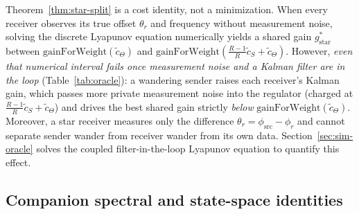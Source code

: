 \documentclass[11pt,a4paper]{article}
\theoremstyle{definition}
\begin{document}
Theorem~\ref{thm:star-split} is a cost identity, not a minimization. When
every receiver observes its true offset $\theta_r$ and frequency without
measurement noise, solving the discrete Lyapunov equation numerically yields a
shared gain $g_{\mathrm{star}}^*$ between
$\mathrm{gainForWeight}(\tilde c_\Theta)$ and
$\mathrm{gainForWeight}(\frac{R-1}{R}\tilde c_S + \tilde c_\Theta)$.
However, \emph{even that numerical interval fails once measurement noise and a
Kalman filter are in the loop} (Table~\ref{tab:oracle}): a wandering
sender raises each receiver's Kalman gain, which passes more private measurement
noise into the regulator (charged at $\frac{R-1}{R}\tilde c_S + \tilde c_\Theta$)
and drives the best shared gain strictly \emph{below}
$\mathrm{gainForWeight}(\tilde c_\Theta)$. Moreover, a star receiver measures
only the difference $\theta_r = \phi_{\mathrm{src}} - \phi_r$ and cannot
separate sender wander from receiver wander from its own data.
Section~\ref{sec:sim-oracle} solves the coupled filter-in-the-loop Lyapunov
equation to quantify this effect.

\subsection{Companion spectral and state-space identities}
\end{document}
